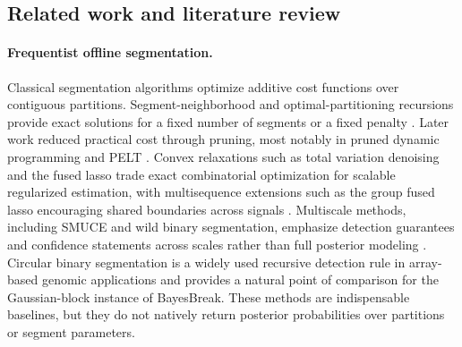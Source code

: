 \subsection{Related work and literature review}\label{sec:lit}

\paragraph{Frequentist offline segmentation.}
Classical segmentation algorithms optimize additive cost functions over contiguous partitions.
Segment-neighborhood and optimal-partitioning recursions provide exact solutions for a fixed
number of segments or a fixed penalty \citep{auger1989segment, jackson2005optpart}. Later work
reduced practical cost through pruning, most notably in pruned dynamic programming and PELT
\citep{rigaill2010pruned, killick2012pelt}. Convex relaxations such as total variation denoising
and the fused lasso trade exact combinatorial optimization for scalable regularized estimation,
with multisequence extensions such as the group fused lasso encouraging shared boundaries across
signals \citep{rudin1992rof, tibshirani2005fused, bleakley2011groupfused}. Multiscale methods,
including SMUCE and wild binary segmentation, emphasize detection guarantees and confidence
statements across scales rather than full posterior modeling \citep{frick2014smuce,
  fryzlewicz2014wbs}. Circular binary segmentation \citep{olshen2004cbs} is a widely used
recursive detection rule in array-based genomic applications and provides a natural point of
comparison for the Gaussian-block instance of BayesBreak. These methods are indispensable
baselines, but they do not natively return posterior probabilities over partitions or segment
parameters.

